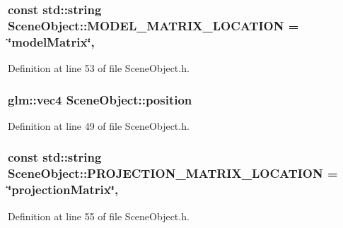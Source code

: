 \subsubsection[{M\+O\+D\+E\+L\+\_\+\+M\+A\+T\+R\+I\+X\+\_\+\+L\+O\+C\+A\+T\+I\+O\+N}]{\setlength{\rightskip}{0pt plus 5cm}const std\+::string Scene\+Object\+::\+M\+O\+D\+E\+L\+\_\+\+M\+A\+T\+R\+I\+X\+\_\+\+L\+O\+C\+A\+T\+I\+O\+N = \char`\"{}model\+Matrix\char`\"{}\hspace{0.3cm}{\ttfamily [static]}, {\ttfamily [protected]}}\label{class_scene_object_a62d236f4f5c52b66bd02d13d09b6ce5e}


Definition at line 53 of file Scene\+Object.\+h.

\hypertarget{class_scene_object_ab4aa9bed778001970c38ea11ef34b285}{}
\subsubsection[{position}]{\setlength{\rightskip}{0pt plus 5cm}glm\+::vec4 Scene\+Object\+::position\hspace{0.3cm}{\ttfamily [protected]}}\label{class_scene_object_ab4aa9bed778001970c38ea11ef34b285}


Definition at line 49 of file Scene\+Object.\+h.

\hypertarget{class_scene_object_ad9a8c9c39a4a262c5e379c0bda184541}{}
\subsubsection[{P\+R\+O\+J\+E\+C\+T\+I\+O\+N\+\_\+\+M\+A\+T\+R\+I\+X\+\_\+\+L\+O\+C\+A\+T\+I\+O\+N}]{\setlength{\rightskip}{0pt plus 5cm}const std\+::string Scene\+Object\+::\+P\+R\+O\+J\+E\+C\+T\+I\+O\+N\+\_\+\+M\+A\+T\+R\+I\+X\+\_\+\+L\+O\+C\+A\+T\+I\+O\+N = \char`\"{}projection\+Matrix\char`\"{}\hspace{0.3cm}{\ttfamily [static]}, {\ttfamily [protected]}}\label{class_scene_object_ad9a8c9c39a4a262c5e379c0bda184541}


Definition at line 55 of file Scene\+Object.\+h.

